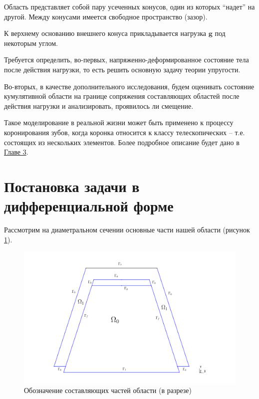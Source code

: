 \documentclass[a4paper, 14pt]{extreport}
\begin{document}
Область представляет собой пару усеченных конусов, один из которых
\enquote{надет} на другой. Между конусами имеется свободное пространство (зазор).

К верхнему основанию внешнего конуса прикладывается нагрузка $\textbf{g}$
под некоторым углом.

Требуется определить, во-первых, напряженно-деформированное состояние тела после действия нагрузки, то есть решить основную задачу теории упругости.

Во-вторых, в качестве дополнительного исследования, будем оценивать состояние кумулятивной области на границе сопряжения составляющих областей после действия нагрузки и анализировать, проявилось ли смещение.

Такое моделирование в реальной жизни может быть применено к
процессу коронирования зубов, когда коронка относится к 
классу телескопических -- т.е. состоящих из нескольких 
элементов. Более подробное описание будет дано в
 \hyperref[ch:exp]{Главе 3}.



\section{Постановка задачи в дифференциальной форме}

Рассмотрим на диаметральном сечении основные части нашей области 
(рисунок \ref{fig: marked_domain}).
\begin{figure}[H]
	\center
	\includegraphics[scale=0.4]{pictures/marked_domain.png}
	\caption{Обозначение составляющих частей области (в разрезе)}
	\label{fig: marked_domain}
\end{figure}
\end{document}
